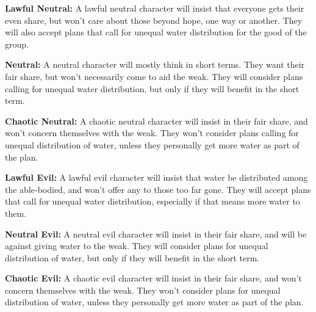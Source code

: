 \textbf{Lawful Neutral:} A lawful neutral character will insist that everyone gets their even share, but won't care about those beyond hope, one way or another. They will also accept plans that call for unequal water distribution for the good of the group.

\textbf{Neutral:} A neutral character will mostly think in short terms. They want their fair share, but won't necessarily come to aid the weak. They will consider plans calling for unequal water distribution, but only if they will benefit in the short term.

\textbf{Chaotic Neutral:} A chaotic neutral character will insist in their fair share, and won't concern themselves with the weak. They won't consider plans calling for unequal distribution of water, unless they personally get more water as part of the plan.

\textbf{Lawful Evil:} A lawful evil character will insist that water be distributed among the able-bodied, and won't offer any to those too far gone. They will accept plans that call for unequal water distribution, especially if that means more water to them.

\textbf{Neutral Evil:} A neutral evil character will insist in their fair share, and will be against giving water to the weak. They will consider plans for unequal distribution of water, but only if they will benefit in the short term.

\textbf{Chaotic Evil:} A chaotic evil character will insist in their fair share, and won't concern themselves with the weak. They won't consider plans for unequal distribution of water, unless they personally get more water as part of the plan.
